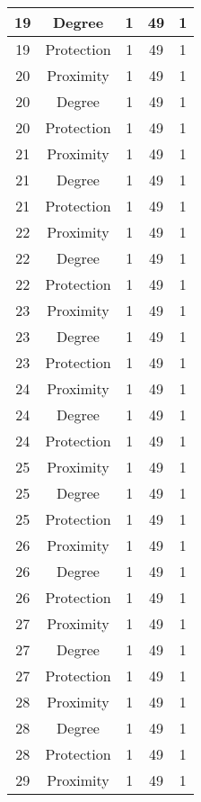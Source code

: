 \documentclass[results.tex]{subfiles}
\begin{document}
\begin{center}
\begin{tabular}{| c || c | c | c | c |}
    \hline
    19 & Degree & 1 & 49 & 1 \\ 
    \hline
    19 & Protection & 1 & 49 & 1 \\ 
    \hline
    20 & Proximity & 1 & 49 & 1 \\ 
    \hline
    20 & Degree & 1 & 49 & 1 \\ 
    \hline
    20 & Protection & 1 & 49 & 1 \\ 
    \hline
    21 & Proximity & 1 & 49 & 1 \\ 
    \hline
    21 & Degree & 1 & 49 & 1 \\ 
    \hline
    21 & Protection & 1 & 49 & 1 \\ 
    \hline
    22 & Proximity & 1 & 49 & 1 \\ 
    \hline
    22 & Degree & 1 & 49 & 1 \\ 
    \hline
    22 & Protection & 1 & 49 & 1 \\ 
    \hline
    23 & Proximity & 1 & 49 & 1 \\ 
    \hline
    23 & Degree & 1 & 49 & 1 \\ 
    \hline
    23 & Protection & 1 & 49 & 1 \\ 
    \hline
    24 & Proximity & 1 & 49 & 1 \\ 
    \hline
    24 & Degree & 1 & 49 & 1 \\ 
    \hline
    24 & Protection & 1 & 49 & 1 \\ 
    \hline
    25 & Proximity & 1 & 49 & 1 \\ 
    \hline
    25 & Degree & 1 & 49 & 1 \\ 
    \hline
    25 & Protection & 1 & 49 & 1 \\ 
    \hline
    26 & Proximity & 1 & 49 & 1 \\ 
    \hline
    26 & Degree & 1 & 49 & 1 \\ 
    \hline
    26 & Protection & 1 & 49 & 1 \\ 
    \hline
    27 & Proximity & 1 & 49 & 1 \\ 
    \hline
    27 & Degree & 1 & 49 & 1 \\ 
    \hline
    27 & Protection & 1 & 49 & 1 \\ 
    \hline
    28 & Proximity & 1 & 49 & 1 \\ 
    \hline
    28 & Degree & 1 & 49 & 1 \\ 
    \hline
    28 & Protection & 1 & 49 & 1 \\ 
    \hline
    29 & Proximity & 1 & 49 & 1 \\ 
    \hline

\end{tabular}
\end{center}
\end{document}
